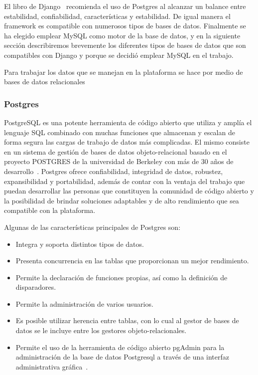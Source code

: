 \documentclass[journal,transmag]{IEEEtran}
\begin{document}
El libro de Django~\cite{DjangoM} recomienda el uso de Postgres al alcanzar un balance entre estabilidad, confiabilidad, características y estabilidad. De igual manera el framework es compatible con numerosos tipos de bases de datos. Finalmente se ha elegido emplear MySQL como motor de la base de datos, y en la siguiente sección describiremos brevemente los diferentes tipos de bases de datos que son compatibles con Django y porque se decidió emplear MySQL en el trabajo.

Para trabajar los datos que se manejan en la plataforma se hace por medio de bases de datos relacionales
\subsubsection{Postgres}
PostgreSQL es una potente herramienta de código abierto que utiliza y amplía el lenguaje SQL combinado con muchas funciones que almacenan y escalan de forma segura las cargas de trabajo de datos más complicadas. El mismo consiste en un sistema de gestión de bases de datos objeto-relacional basado en el proyecto POSTGRES de la universidad de Berkeley con más de 30 años de desarrollo~\cite{Postgres}. Postgres ofrece confiabilidad, integridad de datos, robustez, expansibilidad y portabilidad, además de contar con la ventaja del trabajo que puedan desarrollar las personas que constituyen la comunidad de código abierto y la posibilidad de brindar soluciones adaptables y de alto rendimiento que sea compatible con la plataforma. 

Algunas de las características principales de Postgres son:

\begin{itemize}
\item Integra y soporta distintos tipos de datos.
\item Presenta concurrencia en las tablas que proporcionan un mejor rendimiento.
\item Permite la declaración de funciones propias, así como la definición de disparadores.
\item Permite la administración de varios usuarios.
\item Es posible utilizar herencia entre tablas, con lo cual al gestor de bases de datos se le incluye entre los gestores objeto-relacionales.
\item Permite el uso de la herramienta de código abierto pgAdmin para la administración de la base de datos Postgresql a través de una interfaz administrativa gráfica~\cite{Pgadmin}.
\end{itemize}
\end{document}
